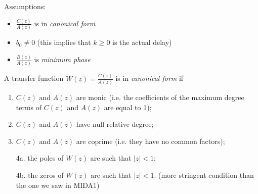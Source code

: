 Assumptions:
\begin{itemize}
    \item $\frac{C(z)}{A(z)}$ is in \emph{canonical form}
    \item $b_0\ne 0$ (this implies that $k \ge 0$ is the actual delay)
    \item $\frac{B(z)}{A(z)}$ is \emph{minimum phase}
\end{itemize}

\begin{recall}
    A transfer function $W(z) = \frac{C(z)}{A(z)}$ is in \emph{canonical form} if 
    \begin{enumerate}
        \item $C(z)$ and $A(z)$ are monic (i.e. the coefficients of the maximum degree terms of $C(z)$ and $A(z)$ are equal to 1);
        \item $C(z)$ and $A(z)$ have null relative degree;
        \item $C(z)$ and $A(z)$ are coprime (i.e. they have no common factors);
        \item[4a.]the poles of $W(z)$ are such that $|z| < 1$;
        \item[4b.]the zeros of $W(z)$ are such that $|z| < 1$. (more stringent condition than the one we saw in MIDA1)
    \end{enumerate}
\end{recall}

